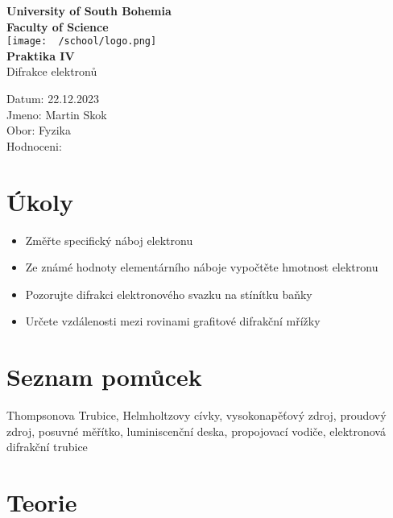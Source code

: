 \documentclass{article}
\begin{document}
\begin{center}
\textbf{\Huge{University of South Bohemia}}\\
\vspace{50px}
\textbf{\Large{Faculty of Science}} \\
\vspace{30px}
\texttt{[image: ~/school/logo.png]} \\
\vspace{30px}
\textbf{\large{Praktika IV}}
\vspace{20px}
\\
\vspace{20px}
\large{Difrakce elektronů} \\
\vspace{60px}
\end{center}
\begin{flushleft}
Datum: 22.12.2023 \\
Jmeno: Martin Skok \\
Obor: Fyzika \\
Hodnoceni:
\end{flushleft}
\newpage
\section{Úkoly}
\begin{itemize}
  \item Změřte specifický náboj elektronu
  \item Ze známé hodnoty elementárního náboje vypočtěte hmotnost elektronu
  \item Pozorujte difrakci elektronového svazku na stínítku baňky
  \item Určete vzdálenosti mezi rovinami grafitové difrakční mřížky
\end{itemize}
\section{Seznam pomůcek}
Thompsonova Trubice,
Helmholtzovy cívky,
vysokonapěťový zdroj,
proudový zdroj,
posuvné měřítko,
luminiscenční deska,
propojovací vodiče,
elektronová difrakční trubice
\section{Teorie}
\end{document}
